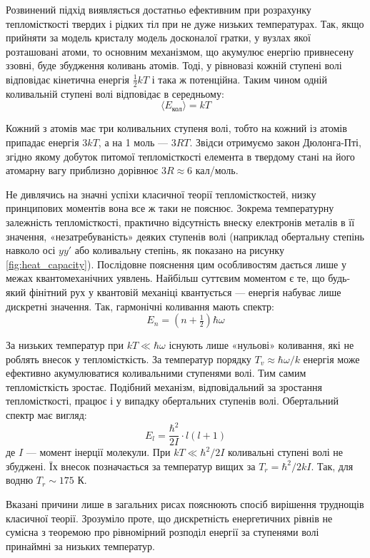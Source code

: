 Розвинений підхід виявляється достатньо ефективним при розрахунку тепломісткості твердих і рідких тіл
при не дуже низьких температурах. Так, якщо прийняти за модель кристалу модель досконалої гратки, у
вузлах якої розташовані атоми, то основним механізмом, що акумулює енергію привнесену ззовні, буде
збудження коливань атомів. Тоді, у рівновазі кожній ступені волі відповідає кінетична енергія
$\frac{1}{2}kT$ і така ж потенційна. Таким чином одній коливальній ступені волі відповідає в
середньому:
\begin{equation}
    \langle E_{\text{кол}} \rangle = kT
    \label{eq:127.8}
\end{equation}

Кожний з атомів має три коливальних ступеня волі, тобто на кожний із атомів припадає енергія $3kT$, а
на 1 моль --- $3RT$. Звідси отримуємо закон Дюлонга-Пті, згідно якому добуток питомої тепломісткості
елемента в твердому стані на його атомарну вагу приблизно дорівнює $3R \approx 6$ кал/моль.

Не дивлячись на значні успіхи класичної теорії тепломісткостей, низку принципових моментів вона все ж
таки не пояснює. Зокрема температурну залежність тепломісткості, практично відсутність внеску
електронів металів в її значення, «незатребуваність» деяких ступенів волі (наприклад обертальну
степінь навколо осі $yy'$ або коливальну степінь, як показано на рисунку \ref{fig:heat_capacity}).
Послідовне пояснення цим особливостям дається лише у межах квантомеханічних уявлень. Найбільш суттєвим
моментом є те, що будь-який фінітний рух у квантовій механіці квантується --- енергія набуває лише
дискретні значення. Так, гармонічні коливання мають спектр:
\begin{equation}
    E_{n} = (n + \tfrac{1}{2})\hbar\omega
    \label{eq:127.9}
\end{equation}

За низьких температур при $kT \ll \hbar\omega$ існують лише «нульові» коливання, які не роблять внесок
у тепломісткість. За температур порядку $T_v \approx \hbar\omega/k$ енергія може ефективно
акумулюватися коливальними ступенями волі. Тим самим тепломісткість зростає. Подібний механізм,
відповідальний за зростання тепломісткості, працює і у випадку обертальних ступенів волі. Обертальний
спектр має вигляд:
\begin{equation}
    E_{l} = \frac{\hbar^{2}}{2I} \cdot l(l + 1)
    \label{eq:127.10}
\end{equation}
де $I$ --- момент інерції молекули. При $kT \ll \hbar^{2}/2I$ коливальні ступені волі не збуджені. Їх
внесок позначається за температур вищих за $T_r = \hbar^{2}/2kI$. Так, для водню $T_r \sim 175$ К.

Вказані причини лише в загальних рисах пояснюють спосіб вирішення труднощів класичної теорії.
Зрозуміло проте, що дискретність енергетичних рівнів не сумісна з теоремою про рівномірний розподіл
енергії за ступенями волі принаймні за низьких температур.
